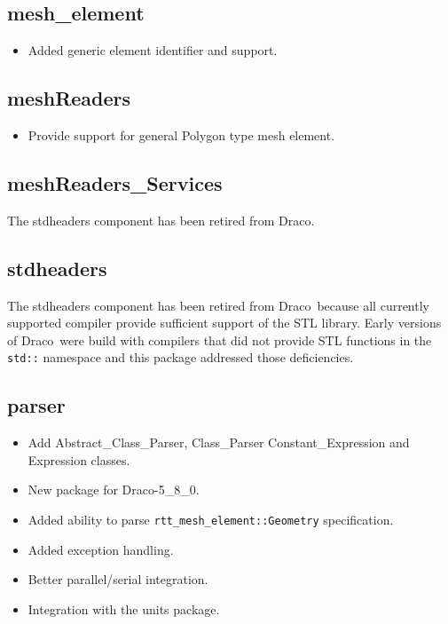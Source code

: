 \documentclass[note]{ResearchNote}
\newcommand{\draco}{Draco}
\begin{document}
\subsection{mesh\_element}
\label{changes:mes-element}
\begin{itemize}
\item Added generic element identifier and support.
\end{itemize}

\subsection{meshReaders}
\label{changes:meshReaders}
\begin{itemize}
\item Provide support for general Polygon type mesh element.
\end{itemize}

\subsection{meshReaders\_Services}
\label{changes:meshReaders-Services}
The stdheaders component has been retired from \draco.

\subsection{stdheaders}
\label{changes:stdheaders}
The stdheaders component has been retired from \draco\ because all
currently supported compiler provide sufficient support of the STL
library.  Early versions of \draco\ were build with compilers that did
not provide STL functions in the \texttt{std::} namespace and this
package addressed those deficiencies.

\subsection{parser}
\label{changes:parser}
\begin{itemize}
\item Add \textsf{Abstract\_Class\_Parser}, \textsf{Class\_Parser}
  \textsf{Constant\_Expression} and \textsf{Expression} classes.
\item New package for \draco-5\_8\_0.
\item Added ability to parse \texttt{rtt\_mesh\_element::Geometry}
  specification. 
\item Added exception handling.
\item Better parallel/serial integration.
\item Integration with the \textsf{units} package.
\end{itemize}
\end{document}
